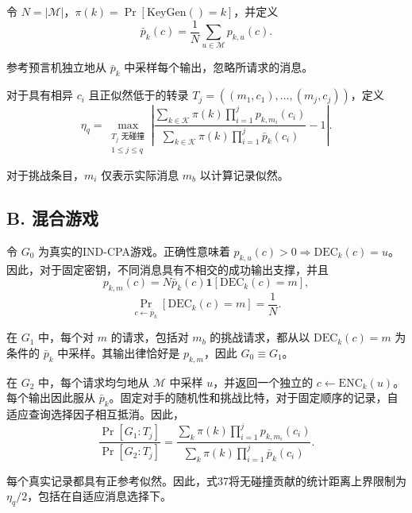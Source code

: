 令 \(N = |\mathcal{M}|\)，\(\pi(k) = \Pr[\mathrm{KeyGen}() = k]\)，并定义
\begin{equation}
\bar{p}_k(c) = \frac{1}{N} \sum_{u \in \mathcal{M}} p_{k,u}(c). \tag{36}
\end{equation}

参考预言机独立地从 \(\bar{p}_k\) 中采样每个输出，忽略所请求的消息。

对于具有相异 \(c_i\) 且正似然低于的转录 \(T_j = ((m_1, c_1), \ldots, (m_j, c_j))\)，定义
\begin{equation}
\eta_q = \max_{\substack{T_j \text{ 无碰撞} \\ 1 \le j \le q}} \left| \frac{\sum_{k \in \mathcal{K}} \pi(k) \prod_{i=1}^j p_{k,m_i}(c_i)}{\sum_{k \in \mathcal{K}} \pi(k) \prod_{i=1}^j \bar{p}_k(c_i)} - 1 \right|. \tag{37}
\end{equation}

对于挑战条目，\(m_i\) 仅表示实际消息 \(m_b\) 以计算记录似然。

\subsection*{B. 混合游戏}

令 \(G_0\) 为真实的IND-CPA游戏。正确性意味着 \(p_{k,u}(c) > 0 \Rightarrow \mathrm{DEC}_k(c) = u\)。因此，对于固定密钥，不同消息具有不相交的成功输出支撑，并且
\begin{equation}
p_{k,m}(c) = N \bar{p}_k(c) \mathbf{1}[\mathrm{DEC}_k(c) = m],
\end{equation}
\begin{equation}
\Pr_{c \leftarrow \bar{p}_k} [\mathrm{DEC}_k(c) = m] = \frac{1}{N}. \tag{38}
\end{equation}

在 \(G_1\) 中，每个对 \(m\) 的请求，包括对 \(m_b\) 的挑战请求，都从以 \(\mathrm{DEC}_k(c) = m\) 为条件的 \(\bar{p}_k\) 中采样。其输出律恰好是 \(p_{k,m}\)，因此 \(G_0 \equiv G_1\)。

在 \(G_2\) 中，每个请求均匀地从 \(\mathcal{M}\) 中采样 \(u\)，并返回一个独立的 \(c \leftarrow \mathrm{ENC}_k(u)\)。每个输出因此服从 \(\bar{p}_k\)。固定对手的随机性和挑战比特，对于固定顺序的记录，自适应查询选择因子相互抵消。因此，
\begin{equation}
\frac{\Pr[G_1 : T_j]}{\Pr[G_2 : T_j]} = \frac{\sum_k \pi(k) \prod_{i=1}^j p_{k,m_i}(c_i)}{\sum_k \pi(k) \prod_{i=1}^j \bar{p}_k(c_i)}. \tag{39}
\end{equation}

每个真实记录都具有正参考似然。因此，式37将无碰撞贡献的统计距离上界限制为 \(\eta_q/2\)，包括在自适应消息选择下。

